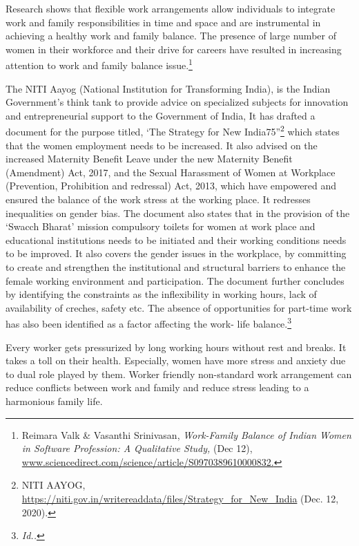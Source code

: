 \begin{multicols}{2}
\noi
Research shows that flexible work arrangements allow individuals to integrate work and
family responsibilities in time and space and are instrumental in achieving a healthy work and
family balance. The presence of large number of women in their workforce and their drive for
careers have resulted in increasing attention to work and family balance issue.\footnote{Reimara Valk \& Vasanthi Srinivasan, \textit{Work-Family Balance of Indian Women in Software Profession: A
Qualitative Study,} (Dec 12), \url{www.sciencedirect.com/science/article/S0970389610000832.}}



\noi
The NITI Aayog (National Institution for Transforming India), is the Indian Government’s
think tank to provide advice on specialized subjects for innovation and entrepreneurial
support to the Government of India, It has drafted a document for the purpose titled, ‘The
Strategy for New India\@75”\footnote{NITI AAYOG, \url{https://niti.gov.in/writereaddata/files/Strategy_for_New_India} (Dec. 12, 2020).} which states that the women employment needs to be
increased. It also advised on the increased Maternity Benefit Leave under the new Maternity
Benefit (Amendment) Act, 2017, and the Sexual Harassment of Women at Workplace
(Prevention, Prohibition and redressal) Act, 2013, which have empowered and ensured the
balance of the work stress at the working place. It redresses inequalities on gender bias. The document also states that in the provision of the ‘Swacch Bharat’ mission compulsory toilets
for women at work place and educational institutions needs to be initiated and their working
conditions needs to be improved. It also covers the gender issues in the workplace, by
committing to create and strengthen the institutional and structural barriers to enhance the
female working environment and participation. The document further concludes by
identifying the constraints as the inflexibility in working hours, lack of availability of
creches, safety etc. The absence of opportunities for part-time work has also been identified
as a factor affecting the work- life balance.\footnote{\textit{Id..}}


\noi
Every worker gets pressurized by long working hours without rest and breaks. It takes a toll
on their health. Especially, women have more stress and anxiety due to dual role played by
them. Worker friendly non-standard work arrangement can reduce conflicts between work
and family and reduce stress leading to a harmonious family life.


\end{multicols}
